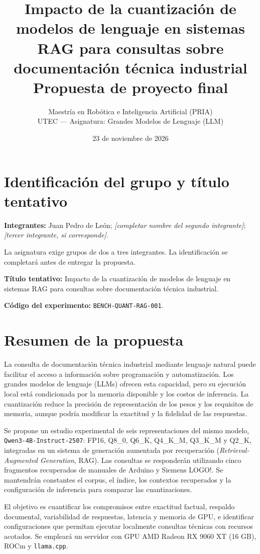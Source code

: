 \documentclass[11pt,a4paper]{article}
\title{\textbf{Impacto de la cuantización de modelos de lenguaje en sistemas RAG para consultas sobre documentación técnica industrial}\\[0.5em]\large Propuesta de proyecto final}
\author{Maestría en Robótica e Inteligencia Artificial (PRIA)\\UTEC --- Asignatura: Grandes Modelos de Lenguaje (LLM)}
\date{23 de noviembre de 2026}
\begin{document}
\maketitle
\section{Identificación del grupo y título tentativo}
\textbf{Integrantes:} Juan Pedro de León; \emph{[completar nombre del segundo integrante]}; \emph{[tercer integrante, si corresponde]}.

La asignatura exige grupos de dos a tres integrantes. La identificación se completará antes de entregar la propuesta.

\textbf{Título tentativo:} Impacto de la cuantización de modelos de lenguaje en sistemas RAG para consultas sobre documentación técnica industrial.

\textbf{Código del experimento:} \texttt{BENCH-QUANT-RAG-001}.

\section{Resumen de la propuesta}
La consulta de documentación técnica industrial mediante lenguaje natural puede facilitar el acceso a información sobre programación y automatización. Los grandes modelos de lenguaje (LLMs) ofrecen esta capacidad, pero su ejecución local está condicionada por la memoria disponible y los costos de inferencia. La cuantización reduce la precisión de representación de los pesos y los requisitos de memoria, aunque podría modificar la exactitud y la fidelidad de las respuestas.

Se propone un estudio experimental de seis representaciones del mismo modelo, \texttt{Qwen3-4B-Instruct-2507}: FP16, Q8\_0, Q6\_K, Q4\_K\_M, Q3\_K\_M y Q2\_K, integradas en un sistema de generación aumentada por recuperación (\emph{Retrieval-Augmented Generation}, RAG). Las consultas se responderán utilizando cinco fragmentos recuperados de manuales de Arduino y Siemens LOGO!. Se mantendrán constantes el corpus, el índice, los contextos recuperados y la configuración de inferencia para comparar las cuantizaciones.

El objetivo es cuantificar los compromisos entre exactitud factual, respaldo documental, variabilidad de respuestas, latencia y memoria de GPU, e identificar configuraciones que permitan ejecutar localmente consultas técnicas con recursos acotados. Se empleará un servidor con GPU AMD Radeon RX 9060 XT (16 GB), ROCm y \texttt{llama.cpp}.
\end{document}
